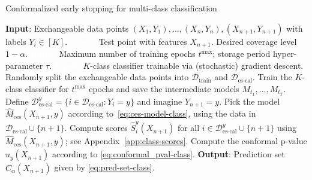 \begin{algorithm}[H]
    \caption{Conformalized early stopping for multi-class classification}
    \label{alg:class_full_seq}
    \begin{algorithmic}[1]
        \STATE \textbf{Input}: Exchangeable data points $(X_{1},Y_{1}), \ldots, (X_{n},Y_{n}), (X_{n+1},Y_{n+1})$ with labels $Y_i \in [K]$.
        \STATE \textcolor{white}{\textbf{Input}:} Test point with features $X_{n+1}$. Desired coverage level $1-\alpha$.
        \STATE \textcolor{white}{\textbf{Input}:} Maximum number of training epochs $t^{\max}$; storage period hyper-parameter $\tau$.
        \STATE \textcolor{white}{\textbf{Input}:} $K$-class classifier trainable via (stochastic) gradient descent.
        \STATE Randomly split the exchangeable data points into $\mathcal{D}_{\text{train}}$ and $\mathcal{D}_{\text{es-cal}}$.
        \STATE Train the $K$-class classifier for $t^{\text{max}}$ epochs and save the intermediate models $M_{t_1} , \dots, M_{t_T}$.
        \STATE Define $\mathcal{D}^y_{\text{es-cal}} = \{i \in \mathcal{D}_{\text{es-cal}} : Y_i = y \}$ and imagine $Y_{n+1}=y$.
        \STATE Pick the model $\hat{M}_{\text{ces}}(X_{n+1},y)$ according to~\eqref{eq:ces-model-class}, using the data in $\mathcal{D}_{\text{es-cal}} \cup \{n+1\}$.
        \STATE Compute scores $\hat{S}_i^y(X_{n+1})$ for all $i \in \mathcal{D}^y_{\text{es-cal}} \cup \{n+1\}$ using $\hat{M}_{\text{ces}}(X_{n+1},y)$; see Appendix~\ref{app:class-scores}.
        \STATE Compute the conformal p-value $\hat{u}_y(X_{n+1})$ according to \eqref{eq:conformal_pval-class}.
        \ENDFOR
        \STATE \textbf{Output}: Prediction set $\hat{C}_{\alpha}(X_{n+1})$ given by \eqref{eq:pred-set-class}.
    \end{algorithmic}
\end{algorithm}

